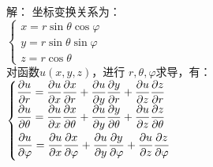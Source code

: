 \begin{frame}
	  \frametitle{}	  
	\alert{解：}  坐标变换关系为：\\
	$\begin{cases}
		x= r\sin \theta \cos \varphi \\
		y= r\sin \theta \sin \varphi \\
		z=r\cos \theta
	\end{cases} $ \\
	对函数$u(x,y,z)$，进行 $r, \theta, \varphi $求导，有：\\ \vspace{0.6em}
	{\small $\begin{cases}
		\dfrac{\partial {u}}{\partial {r}}=\dfrac{\partial {u}}{\partial x} \dfrac{\partial {x}}{\partial {r}}+\dfrac{\partial u}{\partial {y}} \dfrac{\partial {y}}{\partial {r}}+\dfrac{\partial u}{\partial z} \dfrac{\partial z}{\partial {r}} \\ \vspace{0.3em}
		\dfrac{\partial {u}}{\partial \theta}=\dfrac{\partial {u}}{\partial x} \dfrac{\partial{x}}{\partial \theta}+\dfrac{\partial u}{\partial {y}} \dfrac{\partial {y}}{\partial \theta}+\dfrac{\partial{u}}{\partial z} \dfrac{\partial z}{\partial \theta} \\ \vspace{0.3em}
		\dfrac{\partial {u}}{\partial \varphi}=\dfrac{\partial u}{\partial x} \dfrac{\partial{x}}{\partial \varphi}+\dfrac{\partial u}{\partial y} \dfrac{\partial y}{\partial \varphi}+\dfrac{\partial u}{\partial z} \dfrac{\partial z}{\partial \varphi}
	\end{cases} $}\\ \vspace{1em}
\end{frame}	

